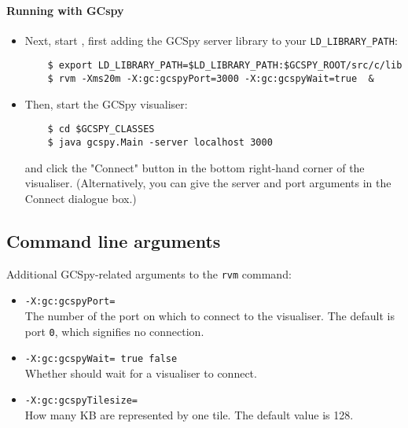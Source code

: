 \paragraph{Running \jrvm{} with GCspy}

\begin{itemize}
   \item  Next, start \jrvm{}, first adding the GCSpy server library to your {\tt LD\_LIBRARY\_PATH}:
\begin{verbatim}
    $ export LD_LIBRARY_PATH=$LD_LIBRARY_PATH:$GCSPY_ROOT/src/c/lib
    $ rvm -Xms20m -X:gc:gcspyPort=3000 -X:gc:gcspyWait=true  &
\end{verbatim}

   \item Then, start the GCSpy visualiser:

\begin{verbatim}
    $ cd $GCSPY_CLASSES
    $ java gcspy.Main -server localhost 3000
\end{verbatim}

      and click the "Connect" button in the bottom right-hand corner
      of the visualiser.  (Alternatively, you can give the server and
      port arguments in the Connect dialogue box.)  

\end{itemize}

\subsection{Command line arguments}

Additional GCSpy-related arguments to the \texttt{rvm} command:

\begin{itemize}

\item {\tt -X:gc:gcspyPort=} \\
    The number of the port on which to connect to the visualiser.  The
    default is port \texttt{0}, which signifies no connection. 

\item {\tt -X:gc:gcspyWait=\Mlbr{} \mbox{\texttt{true}} \Mor{} \mbox{\texttt{false}} \Mrbr} \\
    Whether \jrvm{} should wait for a visualiser to connect.

\item {\tt -X:gc:gcspyTilesize=} \\
    How many KB are represented by one tile.  The default value is 128.

\end{itemize}

